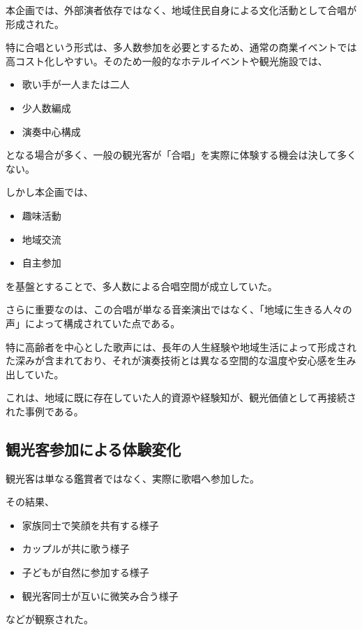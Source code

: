 本企画では、外部演者依存ではなく、地域住民自身による文化活動として合唱が形成された。

特に合唱という形式は、多人数参加を必要とするため、通常の商業イベントでは高コスト化しやすい。そのため一般的なホテルイベントや観光施設では、

\begin{itemize}
\item 歌い手が一人または二人
\item 少人数編成
\item 演奏中心構成
\end{itemize}

となる場合が多く、一般の観光客が「合唱」を実際に体験する機会は決して多くない。

しかし本企画では、

\begin{itemize}
\item 趣味活動
\item 地域交流
\item 自主参加
\end{itemize}

を基盤とすることで、多人数による合唱空間が成立していた。

さらに重要なのは、この合唱が単なる音楽演出ではなく、「地域に生きる人々の声」によって構成されていた点である。

特に高齢者を中心とした歌声には、長年の人生経験や地域生活によって形成された深みが含まれており、それが演奏技術とは異なる空間的な温度や安心感を生み出していた。

これは、地域に既に存在していた人的資源や経験知が、観光価値として再接続された事例である。


\subsection{観光客参加による体験変化}

観光客は単なる鑑賞者ではなく、実際に歌唱へ参加した。

その結果、

\begin{itemize}
\item 家族同士で笑顔を共有する様子
\item カップルが共に歌う様子
\item 子どもが自然に参加する様子
\item 観光客同士が互いに微笑み合う様子
\end{itemize}

などが観察された。


